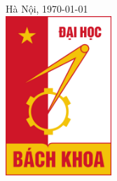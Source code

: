 \documentclass[12pt]{report}
\begin{document}
\begin{titlepage}


{\large Hà Nội, \today}\\[1cm] %


\includegraphics[width=4cm]{hust.jpg}\\[1cm] %
 

\vfill %

\end{titlepage}

\tableofcontents 
\newpage

\newpage
\setcounter{page}{1}
\end{document}
